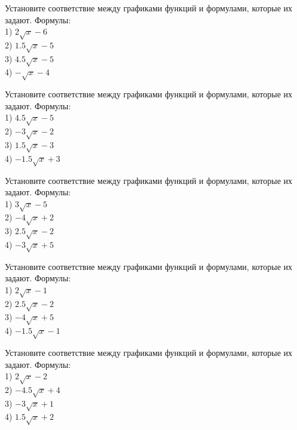 \documentclass[4apaper]{article}
\begin{document}
\begin{taskBN}{21}
Установите соответствие между графиками функций и формулами, которые их задают. Формулы: \\1) $2\sqrt{x}-6$\\2) $1.5\sqrt{x}-5$\\3) $4.5\sqrt{x}-5$\\4) $-\sqrt{x}-4$
\end{taskBN}

\begin{taskBN}{22}
Установите соответствие между графиками функций и формулами, которые их задают. Формулы: \\1) $4.5\sqrt{x}-5$\\2) $-3\sqrt{x}-2$\\3) $1.5\sqrt{x}-3$\\4) $-1.5\sqrt{x}+3$
\end{taskBN}

\begin{taskBN}{23}
Установите соответствие между графиками функций и формулами, которые их задают. Формулы: \\1) $3\sqrt{x}-5$\\2) $-4\sqrt{x}+2$\\3) $2.5\sqrt{x}-2$\\4) $-3\sqrt{x}+5$
\end{taskBN}

\begin{taskBN}{24}
Установите соответствие между графиками функций и формулами, которые их задают. Формулы: \\1) $2\sqrt{x}-1$\\2) $2.5\sqrt{x}-2$\\3) $-4\sqrt{x}+5$\\4) $-1.5\sqrt{x}-1$
\end{taskBN}

\begin{taskBN}{25}
Установите соответствие между графиками функций и формулами, которые их задают. Формулы: \\1) $2\sqrt{x}-2$\\2) $-4.5\sqrt{x}+4$\\3) $-3\sqrt{x}+1$\\4) $1.5\sqrt{x}+2$
\end{taskBN}
\end{document}
